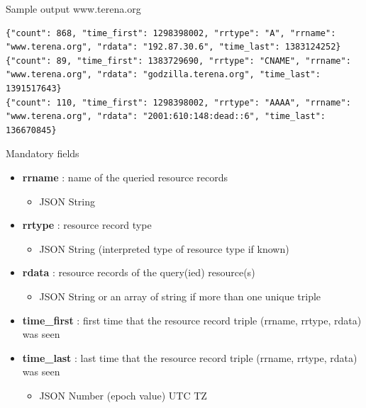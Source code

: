 \begin{frame}[t,fragile]{Sample output www.terena.org}

\lstset{breaklines=true, language=JavaScript}
\begin{lstlisting}
{"count": 868, "time_first": 1298398002, "rrtype": "A", "rrname": "www.terena.org", "rdata": "192.87.30.6", "time_last": 1383124252}
{"count": 89, "time_first": 1383729690, "rrtype": "CNAME", "rrname": "www.terena.org", "rdata": "godzilla.terena.org", "time_last": 1391517643}
{"count": 110, "time_first": 1298398002, "rrtype": "AAAA", "rrname": "www.terena.org", "rdata": "2001:610:148:dead::6", "time_last": 136670845}
\end{lstlisting}
\end{frame}


\begin{frame}[t]{Mandatory fields}
\begin{itemize}
\item \textbf{rrname} : name of the queried resource records
\begin{itemize}
\item JSON String
\end{itemize}
\item \textbf{rrtype} : resource record type
\begin{itemize}
\item JSON String (interpreted type of resource type if known)
\end{itemize}
\item \textbf{rdata} : resource records of the query(ied) resource(s)
\begin{itemize}
\item JSON String or an array of string if more than one unique triple
\end{itemize}
\item \textbf{time\_first} : first time that the resource record triple (rrname, rrtype, rdata) was seen
\item \textbf{time\_last} : last time that the resource record triple (rrname, rrtype, rdata) was seen
\begin{itemize}
\item JSON Number (epoch value) UTC TZ
\end{itemize}
\end{itemize}
\end{frame}

